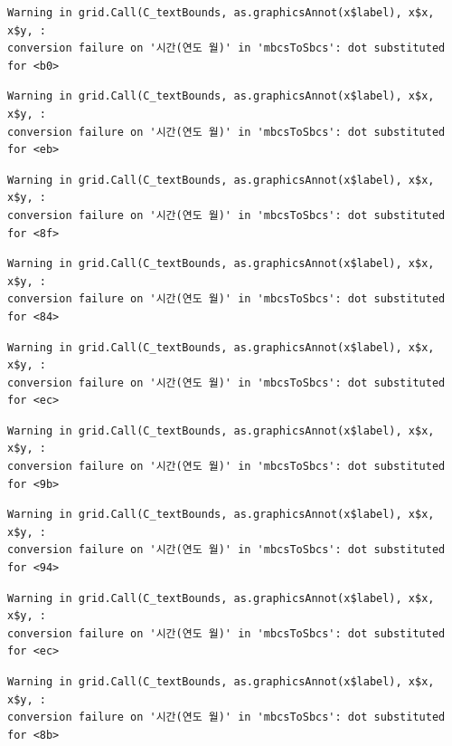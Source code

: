 \documentclass[
  letterpaper,
  DIV=11,
  numbers=noendperiod]{scrreprt}
\begin{document}
\begin{verbatim}
Warning in grid.Call(C_textBounds, as.graphicsAnnot(x$label), x$x, x$y, :
conversion failure on '시간(연도 월)' in 'mbcsToSbcs': dot substituted for <b0>
\end{verbatim}

\begin{verbatim}
Warning in grid.Call(C_textBounds, as.graphicsAnnot(x$label), x$x, x$y, :
conversion failure on '시간(연도 월)' in 'mbcsToSbcs': dot substituted for <eb>
\end{verbatim}

\begin{verbatim}
Warning in grid.Call(C_textBounds, as.graphicsAnnot(x$label), x$x, x$y, :
conversion failure on '시간(연도 월)' in 'mbcsToSbcs': dot substituted for <8f>
\end{verbatim}

\begin{verbatim}
Warning in grid.Call(C_textBounds, as.graphicsAnnot(x$label), x$x, x$y, :
conversion failure on '시간(연도 월)' in 'mbcsToSbcs': dot substituted for <84>
\end{verbatim}

\begin{verbatim}
Warning in grid.Call(C_textBounds, as.graphicsAnnot(x$label), x$x, x$y, :
conversion failure on '시간(연도 월)' in 'mbcsToSbcs': dot substituted for <ec>
\end{verbatim}

\begin{verbatim}
Warning in grid.Call(C_textBounds, as.graphicsAnnot(x$label), x$x, x$y, :
conversion failure on '시간(연도 월)' in 'mbcsToSbcs': dot substituted for <9b>
\end{verbatim}

\begin{verbatim}
Warning in grid.Call(C_textBounds, as.graphicsAnnot(x$label), x$x, x$y, :
conversion failure on '시간(연도 월)' in 'mbcsToSbcs': dot substituted for <94>
\end{verbatim}

\begin{verbatim}
Warning in grid.Call(C_textBounds, as.graphicsAnnot(x$label), x$x, x$y, :
conversion failure on '시간(연도 월)' in 'mbcsToSbcs': dot substituted for <ec>
\end{verbatim}

\begin{verbatim}
Warning in grid.Call(C_textBounds, as.graphicsAnnot(x$label), x$x, x$y, :
conversion failure on '시간(연도 월)' in 'mbcsToSbcs': dot substituted for <8b>
\end{verbatim}
\end{document}
